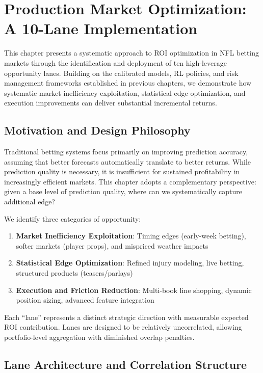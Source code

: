 \chapter{Production Market Optimization: A 10-Lane Implementation}
\label{ch:market-optimization}

This chapter presents a systematic approach to ROI optimization in NFL betting markets through the identification and deployment of ten high-leverage opportunity lanes. Building on the calibrated models, RL policies, and risk management frameworks established in previous chapters, we demonstrate how systematic market inefficiency exploitation, statistical edge optimization, and execution improvements can deliver substantial incremental returns.

\section{Motivation and Design Philosophy}

Traditional betting systems focus primarily on improving prediction accuracy, assuming that better forecasts automatically translate to better returns. While prediction quality is necessary, it is insufficient for sustained profitability in increasingly efficient markets. This chapter adopts a complementary perspective: given a base level of prediction quality, where can we systematically capture additional edge?

We identify three categories of opportunity:
\begin{enumerate}
  \item \textbf{Market Inefficiency Exploitation}: Timing edges (early-week betting), softer markets (player props), and mispriced weather impacts
  \item \textbf{Statistical Edge Optimization}: Refined injury modeling, live betting, structured products (teasers/parlays)
  \item \textbf{Execution and Friction Reduction}: Multi-book line shopping, dynamic position sizing, advanced feature integration
\end{enumerate}

Each ``lane'' represents a distinct strategic direction with measurable expected ROI contribution. Lanes are designed to be relatively uncorrelated, allowing portfolio-level aggregation with diminished overlap penalties.

\section{Lane Architecture and Correlation Structure}

